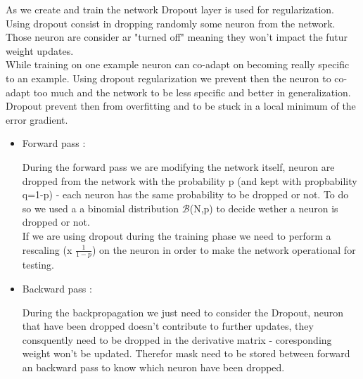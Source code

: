 As we create and train the network Dropout layer is used for regularization. 
Using dropout consist in dropping randomly some neuron from the network. 
Those neuron are consider ar "turned off" meaning they won't impact the futur weight updates. \\
While training on one example neuron can co-adapt on becoming really specific to an example. 
Using dropout regularization we prevent then the neuron to co-adapt too much and the network to be less specific and better in generalization. 
Dropout prevent then from overfitting and to be stuck in a local minimum of the error gradient.

\begin{itemize}
\item Forward pass : 

During the forward pass we are modifying the network itself, neuron are dropped from the network with the probability p (and kept with propbability q=1-p) - each neuron has the same probability to be dropped or not. 
To do so we used a a binomial distribution $\mathcal{B}$(N,p) to decide wether a neuron is dropped or not.\\
If we are using dropout during the training phase we need to perform a rescaling (x $\frac{1}{1-p}$) on the neuron in order to make the network operational for testing. 


\item Backward pass : 

During the backpropagation we just need to consider the Dropout, neuron that have been dropped doesn't contribute to further updates, they consquently need to be dropped in the derivative matrix - coresponding weight won't be updated. Therefor mask need to be stored between forward an backward pass to know which neuron have been dropped.

\end{itemize}
